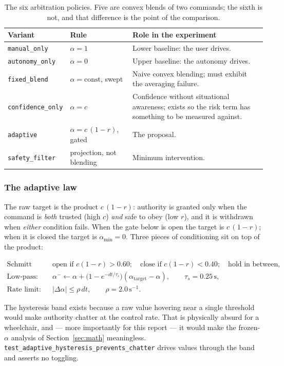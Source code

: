 \documentclass[11pt,a4paper]{article}
\newcommand{\vmanual}{\texttt{manual\_only}}
\newcommand{\vauto}{\texttt{autonomy\_only}}
\newcommand{\vfixed}{\texttt{fixed\_blend}}
\newcommand{\vconf}{\texttt{confidence\_only}}
\newcommand{\vadapt}{\texttt{adaptive}}
\newcommand{\vsafety}{\texttt{safety\_filter}}
\theoremstyle{plain}
\theoremstyle{definition}
\begin{document}
\begin{table}[htbp]
\centering
\small
\begin{tabular}{@{}llp{7.2cm}@{}}
\toprule
Variant & Rule & Role in the experiment \\
\midrule
\vmanual  & $\alpha = 1$ & Lower baseline: the user drives. \\
\vauto    & $\alpha = 0$ & Upper baseline: the autonomy drives. \\
\vfixed   & $\alpha = \text{const}$, swept & Naive convex blending; must
            exhibit the averaging failure. \\
\vconf    & $\alpha = c$ & Confidence without situational awareness;
            exists so the risk term has something to be measured against. \\
\vadapt   & $\alpha = c\,(1-r)$, gated & The proposal. \\
\vsafety  & projection, not blending & Minimum intervention. \\
\bottomrule
\end{tabular}
\caption{The six arbitration policies. Five are convex blends of two
commands; the sixth is not, and that difference is the point of the
comparison.}
\label{tab:variants}
\end{table}

\subsubsection*{The adaptive law}

The raw target is the product $c\,(1-r)$: authority is granted only when
the command is \emph{both} trusted (high $c$) \emph{and} safe to obey
(low $r$), and it is withdrawn when \emph{either} condition fails. When
the gate below is open the target is $c\,(1-r)$; when it is closed the
target is $\alpha_{\min} = 0$. Three
pieces of conditioning sit on top of the product:

\begin{align}
\text{Schmitt gate:}\quad
&\text{open if } c(1-r) > 0.60;\quad \text{close if } c(1-r) < 0.40;
\quad \text{hold in between}, \\
\text{Low-pass:}\quad
&\alpha^{-} \leftarrow \alpha + \bigl(1 - e^{-dt/\tau_s}\bigr)
   (\alpha_{\mathrm{target}} - \alpha),
   \qquad \tau_s = 0.25\,\mathrm{s},\\
\text{Rate limit:}\quad
&|\Delta \alpha| \le \rho\,dt, \qquad \rho = 2.0\,\mathrm{s}^{-1}.
\end{align}

The hysteresis band exists because a raw value hovering near a single
threshold would make authority chatter at the control rate. That is
physically absurd for a wheelchair, and --- more importantly for this
report --- it would make the frozen-$\alpha$ analysis of
Section~\ref{sec:math} meaningless.
\texttt{test\_adaptive\_hysteresis\_prevents\_chatter} drives values
through the band and asserts no toggling.
\end{document}
